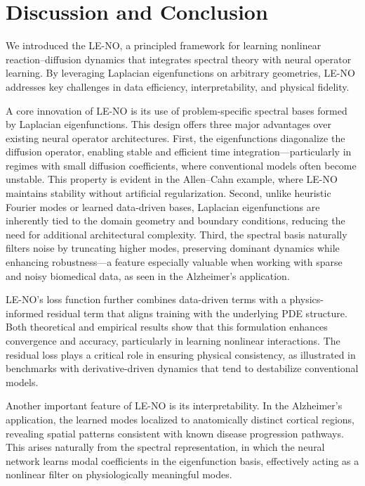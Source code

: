 \documentclass[preprint,12pt]{elsarticle}
\theoremstyle{plain}
\numberwithin{figure}{section}
\numberwithin{table}{section}
\begin{document}
\section{Discussion and Conclusion}


We introduced the LE-NO, a principled framework for learning nonlinear reaction--diffusion dynamics that integrates spectral theory with neural operator learning. By leveraging Laplacian eigenfunctions on arbitrary geometries, LE-NO addresses key challenges in data efficiency, interpretability, and physical fidelity.

A core innovation of LE-NO is its use of problem-specific spectral bases formed by Laplacian eigenfunctions. This design offers three major advantages over existing neural operator architectures. First, the eigenfunctions diagonalize the diffusion operator, enabling stable and efficient time integration---particularly in regimes with small diffusion coefficients, where conventional models often become unstable. This property is evident in the Allen--Cahn example, where LE-NO maintains stability without artificial regularization. Second, unlike heuristic Fourier modes or learned data-driven bases, Laplacian eigenfunctions are inherently tied to the domain geometry and boundary conditions, reducing the need for additional architectural complexity. Third, the spectral basis naturally filters noise by truncating higher modes, preserving dominant dynamics while enhancing robustness---a feature especially valuable when working with sparse and noisy biomedical data, as seen in the Alzheimer’s application.

LE-NO’s loss function further combines data-driven terms with a physics-informed residual term that aligns training with the underlying PDE structure. Both theoretical and empirical results show that this formulation enhances convergence and accuracy, particularly in learning nonlinear interactions. The residual loss plays a critical role in ensuring physical consistency, as illustrated in benchmarks with derivative-driven dynamics that tend to destabilize conventional models.

Another important feature of LE-NO is its interpretability. In the Alzheimer’s application, the learned modes localized to anatomically distinct cortical regions, revealing spatial patterns consistent with known disease progression pathways. This arises naturally from the spectral representation, in which the neural network learns modal coefficients in the eigenfunction basis, effectively acting as a nonlinear filter on physiologically meaningful modes.
\end{document}
